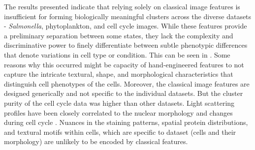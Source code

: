 \documentclass[12pt,a4paper]{article}
\begin{document}
The results presented indicate that relying solely on classical image features is insufficient for forming biologically meaningful clusters across the diverse datasets - \textit{Salmonella}, phytoplankton, and cell cycle images. While these features provide a preliminary separation between some states, they lack the complexity and discriminative power to finely differentiate between subtle phenotypic differences that denote variations in cell type or condition. This can be seen in \cite{multifigure3:overall_figure}. Some reasons why this occurred might be capacity of hand-engineered features to not capture the intricate textural, shape, and morphological characteristics that distinguish cell phenotypes of the cells. Moreover, the classical image features are designed generically and not specific to the individual datasets. But the cluster purity of the cell cycle data was higher than other datasets. Light scattering profiles have been closely correlated to the nuclear morphology and changes during cell cycle \cite{WOS:A1974T155500001, benson_mcdougal_coffey_1984}. Nuances in the staining patterns, spatial protein distributions, and textural motifs within cells, which are specific to dataset (cells and their morphology) are unlikely to be encoded by classical features.
\end{document}
